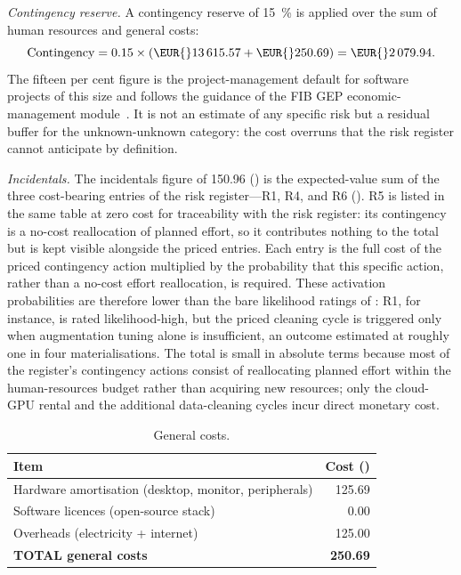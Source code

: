\textit{Contingency reserve.}
A contingency reserve of \SI{15}{\percent} is applied over the
sum of human resources and general costs:
\[
\text{Contingency} = 0.15 \times (\EUR{}13\,615.57 + \EUR{}250.69)
                   = \EUR{}2\,079.94 .
\]
The fifteen per cent figure is the project-management default
for software projects of this size and follows the guidance of
the FIB GEP economic-management
module~\cite{gepModule24EconomicManagement}.
It is not an estimate of any specific risk but a residual buffer
for the unknown-unknown category: the cost overruns that the
risk register cannot anticipate by definition.

\textit{Incidentals.}
The incidentals figure of \EUR{}150.96
() is the expected-value sum of the three
cost-bearing entries of the risk register---R1, R4, and R6
().
R5 is listed in the same table at zero cost for traceability with the
risk register: its contingency is a no-cost reallocation of planned
effort, so it contributes nothing to the total but is kept visible
alongside the priced entries.
Each entry is the full cost of the priced contingency action
multiplied by the probability that this specific
action, rather than a no-cost effort reallocation, is required.
These activation probabilities are therefore lower than the bare
likelihood ratings of : R1, for
instance, is rated likelihood-high, but the priced cleaning
cycle is triggered only when augmentation tuning alone is
insufficient, an outcome estimated at roughly one in four
materialisations.
The total is small in absolute terms because most of the
register's contingency actions consist of reallocating planned
effort within the human-resources budget rather than acquiring
new resources; only the cloud-GPU rental and the additional
data-cleaning cycles incur direct monetary cost.

\begin{table}[ht]
    \centering
    \caption{General costs.}
    \label{tab:general-costs}
    \small
    \setlength{\tabcolsep}{5pt}
    \renewcommand{\arraystretch}{1.35}
    \begin{tabularx}{\linewidth}{@{} L r @{}}
        \toprule
        \textbf{Item} & \textbf{Cost (\EUR{})} \\
        \midrule
        Hardware amortisation (desktop, monitor, peripherals)  & 125.69 \\ \tfgrowsep
        Software licences (open-source stack)                  & 0.00 \\ \tfgrowsep
        Overheads (electricity + internet)                     & 125.00 \\
        \midrule
        \textbf{TOTAL general costs}                           & \textbf{250.69} \\
        \bottomrule
    \end{tabularx}
\end{table}

